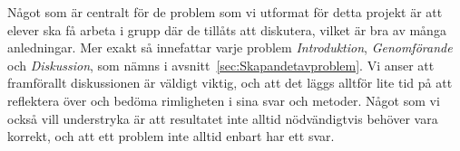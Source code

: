 
\textcolor{Mahogany}{
    Något som är centralt för de problem som vi utformat för detta projekt är att elever ska få arbeta i grupp där de tillåts att diskutera, vilket är bra av många anledningar. Mer exakt så innefattar varje problem \textsl{Introduktion}, \textsl{Genomförande} och \textsl{Diskussion}, som nämns i avsnitt~\ref{sec:Skapandetavproblem}. Vi anser att framförallt diskussionen är väldigt viktig, och att det läggs alltför lite tid på att reflektera över och bedöma rimligheten i sina svar och metoder. Något som vi också vill understryka är att resultatet inte alltid nödvändigtvis behöver vara korrekt, och att ett problem inte alltid enbart har ett svar.
}